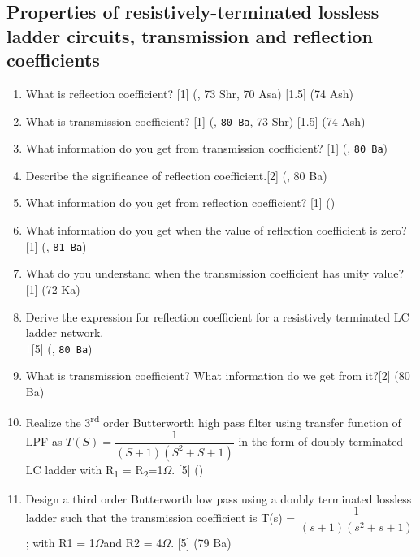 \documentclass[12pt]{article}
\newcommand{\W}{\(\Omega\)}
\newcommand{\enter}{\\\textcolor{white}{1}}
\newcommand{\sub}[1]{\textsubscript{#1}}
\newcommand{\super}[1]{\textsuperscript{#1}}
\begin{document}
\subsection{Properties of resistively-terminated lossless ladder circuits, transmission and reflection coefficients}
	\begin{enumerate}
		\item What is reflection coefficient? \hfill [1] (, 73 Shr, 70 Asa) [1.5] (74 Ash)
	
		\item What is transmission coefficient? \hfill [1] (, \texttt{80 Ba}, 73 Shr) [1.5] (74 Ash)
	
		\item What information do you get from transmission coefficient? \hfill [1] (, \texttt{80 Ba})

		\item Describe the significance of reflection coefficient.\hfill [2] (, 80 Ba)
	
		\item What information do you get from reflection coefficient? \hfill [1] ()
	
		\item What information do you get when the value of reflection coefficient is zero?\hfill [1] (, \texttt{81 Ba})
		
		\item What do you understand when the transmission coefficient has unity value? \hfill [1] (72 Ka)
	
		\item Derive the expression for reflection coefficient for a resistively terminated LC ladder network.
\enter\hfill [5] (, \texttt{80 Ba})
	
		\item What is transmission coefficient? What information do we get from it?\hfill[2] (80 Ba)
	
		\item Realize the 3\super{rd} order Butterworth high pass filter using transfer function of LPF as $T(S)= \dfrac{1}{(S+1)(S^2+S+1)}$ in the form of doubly terminated LC ladder with R\sub{1} = R\sub{2}=1\W. \hfill [5] ()
	
		\item Design a third order Butterworth low pass using a doubly terminated lossless ladder such that the transmission coefficient is T(s) = $\dfrac{1}{(s+1)(s^2+s+1)}$; with R1 = 1\W and R2 = 4\W. \hfill [5] (79 Ba)
	

\end{enumerate}
\end{document}
